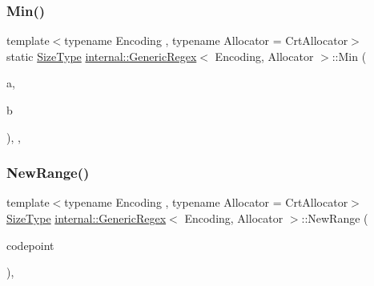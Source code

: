 \subsubsection{\texorpdfstring{Min()}{Min()}}
{\footnotesize\ttfamily template$<$typename Encoding , typename Allocator  = Crt\+Allocator$>$ \\
static \hyperlink{rapidjson_8h_a5ed6e6e67250fadbd041127e6386dcb5}{Size\+Type} \hyperlink{classinternal_1_1GenericRegex}{internal\+::\+Generic\+Regex}$<$ Encoding, Allocator $>$\+::Min (\begin{DoxyParamCaption}\item[{\hyperlink{rapidjson_8h_a5ed6e6e67250fadbd041127e6386dcb5}{Size\+Type}}]{a,  }\item[{\hyperlink{rapidjson_8h_a5ed6e6e67250fadbd041127e6386dcb5}{Size\+Type}}]{b }\end{DoxyParamCaption})\hspace{0.3cm}{\ttfamily [inline]}, {\ttfamily [static]}, {\ttfamily [private]}}

\mbox{\label{classinternal_1_1GenericRegex_a868d6e44d0782e9fbdd476243daa578f}} 
\subsubsection{\texorpdfstring{New\+Range()}{NewRange()}}
{\footnotesize\ttfamily template$<$typename Encoding , typename Allocator  = Crt\+Allocator$>$ \\
\hyperlink{rapidjson_8h_a5ed6e6e67250fadbd041127e6386dcb5}{Size\+Type} \hyperlink{classinternal_1_1GenericRegex}{internal\+::\+Generic\+Regex}$<$ Encoding, Allocator $>$\+::New\+Range (\begin{DoxyParamCaption}\item[{unsigned}]{codepoint }\end{DoxyParamCaption})\hspace{0.3cm}{\ttfamily [inline]}, {\ttfamily [private]}}

\mbox{\label{classinternal_1_1GenericRegex_ad57a48991e61750ef7426c48b1d3e51b}} 
